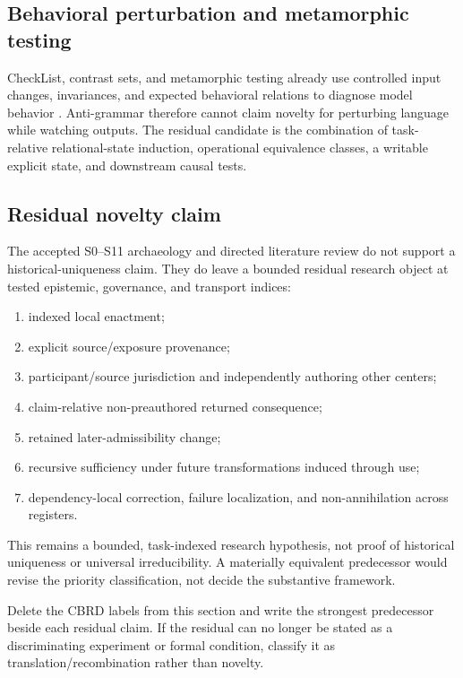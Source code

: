 \subsection{Behavioral perturbation and metamorphic testing}

CheckList, contrast sets, and metamorphic testing already use controlled input changes, invariances, and expected behavioral relations to diagnose model behavior \citep{RibeiroEtAl2020CheckList,GardnerEtAl2020Contrast,ChoEtAl2025Metamorphic}. Anti-grammar therefore cannot claim novelty for perturbing language while watching outputs. The residual candidate is the combination of task-relative relational-state induction, operational equivalence classes, a writable explicit state, and downstream causal tests.

\subsection{Residual novelty claim}

The accepted S0--S11 archaeology and directed literature review do not support a historical-uniqueness claim. They do leave a bounded residual research object at tested epistemic, governance, and transport indices:
\begin{enumerate}[leftmargin=2em]
  \item indexed local enactment;
  \item explicit source/exposure provenance;
  \item participant/source jurisdiction and independently authoring other centers;
  \item claim-relative non-preauthored returned consequence;
  \item retained later-admissibility change;
  \item recursive sufficiency under future transformations induced through use;
  \item dependency-local correction, failure localization, and non-annihilation across registers.
\end{enumerate}

This remains a bounded, task-indexed research hypothesis, not proof of historical uniqueness or universal irreducibility. A materially equivalent predecessor would revise the priority classification, not decide the substantive framework.

\begin{readercheck}
Delete the CBRD labels from this section and write the strongest predecessor beside each residual claim. If the residual can no longer be stated as a discriminating experiment or formal condition, classify it as translation/recombination rather than novelty.
\end{readercheck}

